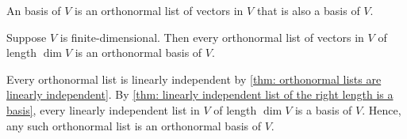 \begin{mydef}
  An  basis of $V$ is an orthonormal list of vectors in $V$ that is also a basis of $V$.
\end{mydef}

\begin{thm}
  \label{thm: orthonormal lists of the right length are orthonormal bases}
  Suppose $V$ is finite-dimensional. Then every orthonormal list of vectors in $V$ of length $\dim V$ is an orthonormal basis of $V$.
\end{thm}
\begin{prf}
  Every orthonormal list is linearly independent by \ref{thm: orthonormal lists are linearly independent}. By \ref{thm: linearly independent list of the right length is a basis}, every linearly independent list in $V$ of length $\dim V$ is a basis of $V$. Hence, any such orthonormal list is an orthonormal basis of $V$.
\end{prf}

